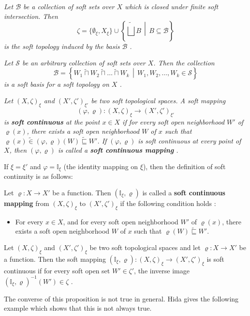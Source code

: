 \documentclass[preprint,12pt]{elsarticle}
\begin{document}
\begin{defn}\em{
Let \( \mathscr{B} \) be a collection of soft sets over \( X\) which is closed under finite soft intersection.
Then \[
\zeta = \{ {\emptyset}_\xi, {X}_\xi  \} \cup \left\{ \widetilde{\bigsqcup} B \,\middle|\, B \subseteq \mathscr{B} \right\}
\] is the soft topology induced by the basis \( \mathscr{B} \)
\cite{Aygun}.
}
\end{defn}
\begin{defn}\em{
Let \( \mathscr{S} \) be an arbitrary collection of soft sets over \( X \).
Then the collection
\[
\mathscr{B}=\left\{ W_1 \widetilde{\sqcap} W_2 \widetilde{\sqcap} \dots \widetilde{\sqcap} W_k \,\middle|\, W_1, W_2, \dots,W_k \in \mathscr{S} \right\}
\]
is a soft basis for a soft topology on \( X \) \cite{Aygun}.
}
\end{defn}
\begin{defn}\em{
Let \( (X, \zeta)_\xi \) and \( (X', \zeta')_{\xi'} \) be two soft topological spaces. A soft mapping \[ (\varphi, \varrho):(X, \zeta)_\xi  \to (X', \zeta')_{\xi'} \] is \textbf{soft continuous} at the point $x\in X$ if for every soft open neighborhood \( W' \) of \( \varrho(x) \),
there exists a soft  open neighborhood \( W \) of \( x\) such that
\(
\varrho(x) \widetilde{\in} (\varphi, \varrho)(W) \widetilde{\sqsubseteq} W'
\). If $(\varphi, \varrho)$ is soft continuous at every point of $X$, then $(\varphi, \varrho)$ is called a \textbf{soft continuous mapping} \cite{Hida}.
}
\end{defn}


If \( \xi = \xi' \) and \( \varphi = \mathbb{I}_\xi \) (the identity mapping on \( \xi \)),
then the definition of soft continuity is as follows:
\begin{defn}\label{cont}\em{
Let \( \varrho: X \to X' \) be a function.
Then \( (\mathbb{I}_\xi,\varrho) \) is called a \textbf{soft continuous mapping} from \( (X, \zeta)_\xi \) to \( (X', \zeta')_\xi \)
if the following condition holds \cite{Hida}:

\begin{itemize}
    \item For every \( x \in X \), and for every soft open neighborhood \( W' \) of \( \varrho(x) \),
    there exists a soft open  neighborhood \( W \) of \( x \) such that
    \(
    \varrho(W) \widetilde{\sqsubseteq} W'.
    \)
\end{itemize}
}
\end{defn}
\begin{prop}\label{inversopen}
    Let \( (X, \zeta)_\xi \) and \( (X', \zeta')_\xi \) be two soft topological spaces and let \( \varrho: X \to X' \) be a function. Then the soft mapping \( (\mathbb{I}_\xi,\varrho)\colon (X, \zeta)_\xi \to (X', \zeta')_\xi \) is soft continuous if for every soft open set \( W' \in \zeta' \), the inverse image \( (\mathbb{I}_\xi,\varrho)^{-1}(W') \in \zeta \) \cite{Hida}.

\end{prop}
 The converse of this proposition is not true in general. Hida \cite{Hida} gives the following example which shows that this is not always true.
\end{document}
